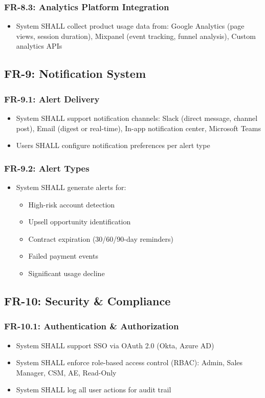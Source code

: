 \documentclass[12pt,a4paper]{article}
\begin{document}
\subsubsection{FR-8.3: Analytics Platform Integration}
\begin{itemize}
    \item System SHALL collect product usage data from: Google Analytics (page views, session duration), Mixpanel (event tracking, funnel analysis), Custom analytics APIs
\end{itemize}

\subsection{FR-9: Notification System}
\subsubsection{FR-9.1: Alert Delivery}
\begin{itemize}
    \item System SHALL support notification channels: Slack (direct message, channel post), Email (digest or real-time), In-app notification center, Microsoft Teams
    \item Users SHALL configure notification preferences per alert type
\end{itemize}
\subsubsection{FR-9.2: Alert Types}
\begin{itemize}
    \item System SHALL generate alerts for:
    \begin{itemize}
        \item High-risk account detection
        \item Upsell opportunity identification
        \item Contract expiration (30/60/90-day reminders)
        \item Failed payment events
        \item Significant usage decline
    \end{itemize}
\end{itemize}

\subsection{FR-10: Security \& Compliance}
\subsubsection{FR-10.1: Authentication \& Authorization}
\begin{itemize}
    \item System SHALL support SSO via OAuth 2.0 (Okta, Azure AD)
    \item System SHALL enforce role-based access control (RBAC): Admin, Sales Manager, CSM, AE, Read-Only
    \item System SHALL log all user actions for audit trail
\end{itemize}
\end{document}
